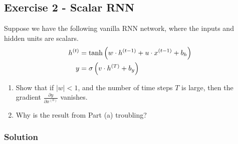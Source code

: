 \documentclass[
  letterpaper,
  DIV=11,
  numbers=noendperiod]{scrartcl}
\begin{document}
\subsection{Exercise 2 - Scalar RNN}\label{exercise-2---scalar-rnn}

Suppose we have the following vanilla RNN network, where the inputs and
hidden units are scalars. \begin{align*}
h^{(t)} &= \tanh\left(w \cdot h^{(t-1)} + u \cdot x^{(t-1)} + b_h\right) \\
y &= \sigma\left(v \cdot h^{(T)} + b_y\right)
\end{align*}

\begin{enumerate}
\def\labelenumi{(\alph{enumi})}
\item
  Show that if \(|w| < 1\), and the number of time steps \(T\) is large,
  then the gradient \(\frac{\partial y}{\partial x^{(0)}}\) vanishes.
\item
  Why is the result from Part (a) troubling?
\end{enumerate}

\subsubsection{Solution}\label{solution-1}
\end{document}
